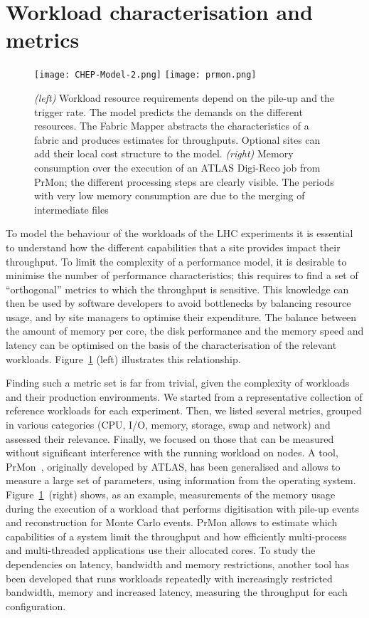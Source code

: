 \section{Workload characterisation and metrics}
\begin{figure}[h]
  \centering
  \texttt{[image: CHEP-Model-2.png]}
  \hfill
  \texttt{[image: prmon.png]}
  \caption{{\em (left)} Workload resource requirements depend on the
    pile-up and the trigger rate. The model predicts the demands on the
    different resources. The Fabric Mapper abstracts the
    characteristics of a fabric and produces estimates for
    throughputs. Optional sites can add their local cost structure to
    the model. {\em (right)} Memory consumption over the execution of
    an ATLAS Digi-Reco job from PrMon; the different processing steps
    are clearly visible. The periods with very low memory consumption
    are due to the merging of intermediate files}
  \label{fig:mapping}
\end{figure}

To model the behaviour of the workloads of the LHC experiments it is
essential to understand how the different capabilities that a site
provides impact their throughput. To limit the complexity of a
performance model, it is desirable to minimise the number of
performance characteristics; this requires to find a set of
``orthogonal'' metrics to which the throughput is sensitive. This
knowledge can then be used by software developers to avoid bottlenecks
by balancing resource usage, and by site managers to optimise their
expenditure. The balance between the amount of memory per core, the
disk performance and the memory speed and latency can be optimised on
the basis of the characterisation of the relevant
workloads. Figure~\ref{fig:mapping} (left) illustrates this relationship.

Finding such a metric set is far from trivial, given the complexity of
workloads and their production environments. We started from a
representative collection of reference workloads for each experiment.
Then, we listed several metrics, grouped in various categories (CPU,
I/O, memory, storage, swap and network) and assessed their
relevance. Finally, we focused on those that can be measured without
significant interference with the running workload on nodes. A tool,
PrMon~\cite{prmon}, originally developed by ATLAS, has been
generalised and allows to measure a large set of parameters, using
information from the operating
system. Figure~\ref{fig:mapping}~(right) shows, as an example,
measurements of the memory usage during the execution of a workload
that performs digitisation with pile-up events and reconstruction for
Monte Carlo events.  PrMon allows to estimate which capabilities of a
system limit the throughput and how efficiently multi-process and
multi-threaded applications use their allocated cores. To study the
dependencies on latency, bandwidth and memory restrictions, another
tool has been developed that runs workloads repeatedly with
increasingly restricted bandwidth, memory and increased latency,
measuring the throughput for each configuration.

